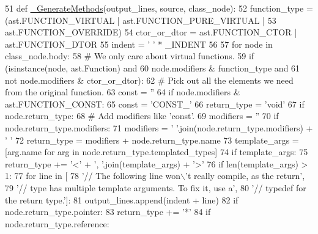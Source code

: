 \begin{DoxyCode}
51 \textcolor{keyword}{def }\hyperlink{namespacecpp_1_1gmock__class_ae1b91676e6a4c7ae21c3ef2394a096a1}{\_GenerateMethods}(output\_lines, source, class\_node):
52   function\_type = (ast.FUNCTION\_VIRTUAL | ast.FUNCTION\_PURE\_VIRTUAL |
53                    ast.FUNCTION\_OVERRIDE)
54   ctor\_or\_dtor = ast.FUNCTION\_CTOR | ast.FUNCTION\_DTOR
55   indent = \textcolor{stringliteral}{' '} * \_INDENT
56 
57   \textcolor{keywordflow}{for} node \textcolor{keywordflow}{in} class\_node.body:
58     \textcolor{comment}{# We only care about virtual functions.}
59     \textcolor{keywordflow}{if} (isinstance(node, ast.Function) \textcolor{keywordflow}{and}
60         node.modifiers & function\_type \textcolor{keywordflow}{and}
61         \textcolor{keywordflow}{not} node.modifiers & ctor\_or\_dtor):
62       \textcolor{comment}{# Pick out all the elements we need from the original function.}
63       const = \textcolor{stringliteral}{''}
64       \textcolor{keywordflow}{if} node.modifiers & ast.FUNCTION\_CONST:
65         const = \textcolor{stringliteral}{'CONST\_'}
66       return\_type = \textcolor{stringliteral}{'void'}
67       \textcolor{keywordflow}{if} node.return\_type:
68         \textcolor{comment}{# Add modifiers like 'const'.}
69         modifiers = \textcolor{stringliteral}{''}
70         \textcolor{keywordflow}{if} node.return\_type.modifiers:
71           modifiers = \textcolor{stringliteral}{' '}.join(node.return\_type.modifiers) + \textcolor{stringliteral}{' '}
72         return\_type = modifiers + node.return\_type.name
73         template\_args = [arg.name \textcolor{keywordflow}{for} arg \textcolor{keywordflow}{in} node.return\_type.templated\_types]
74         \textcolor{keywordflow}{if} template\_args:
75           return\_type += \textcolor{stringliteral}{'<'} + \textcolor{stringliteral}{', '}.join(template\_args) + \textcolor{stringliteral}{'>'}
76           \textcolor{keywordflow}{if} len(template\_args) > 1:
77             \textcolor{keywordflow}{for} line \textcolor{keywordflow}{in} [
78                 \textcolor{stringliteral}{'// The following line won\(\backslash\)'t really compile, as the return'},
79                 \textcolor{stringliteral}{'// type has multiple template arguments.  To fix it, use a'},
80                 \textcolor{stringliteral}{'// typedef for the return type.'}]:
81               output\_lines.append(indent + line)
82         \textcolor{keywordflow}{if} node.return\_type.pointer:
83           return\_type += \textcolor{stringliteral}{'*'}
84         \textcolor{keywordflow}{if} node.return\_type.reference:

\end{DoxyCode}
